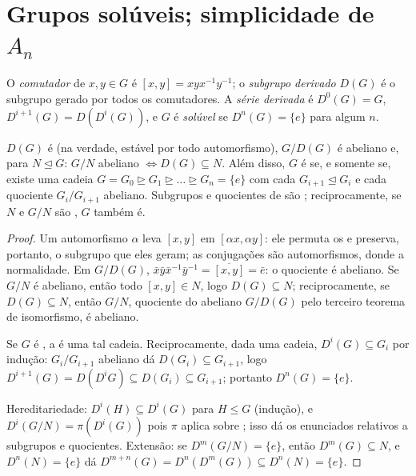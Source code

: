 \section{Grupos solúveis; simplicidade de \texorpdfstring{$A_n$}{An}}

\begin{definition}\label{def:b3:groups:derived}
O \emph{comutador} de $x, y \in G$ é $[x,y]
= xyx^{-1}y^{-1}$; o \emph{subgrupo
derivado} $D(G)$ é o subgrupo gerado por
todos os comutadores. A \emph{série derivada} é $D^0(G) = G$, $D^{i+1}(G) = D(D^i(G))$, e $G$
é \emph{solúvel} se $D^n(G) =
\{e\}$ para algum $n$.
\end{definition}

\begin{proposition}\label{prop:b3:groups:derived}
$D(G)$ é  (na verdade, estável por todo automorfismo),
$G/D(G)$ é abeliano e, para $N \trianglelefteq G$: $G/N$ abeliano $\iff
D(G) \subseteq N$. Além
disso, $G$ é  se, e somente se, existe uma cadeia $G = G_0 \trianglerighteq G_1 \trianglerighteq \dots
\trianglerighteq G_n = \{e\}$ com
cada $G_{i+1} \trianglelefteq
G_i$ e cada quociente $G_i/G_{i+1}$ abeliano. Subgrupos e quocientes de
 são ; reciprocamente, se $N$ e $G/N$ são
, $G$ também é.
\end{proposition}

\begin{proof}
Um automorfismo $\alpha$ leva $[x,y]$ em $[\alpha x, \alpha y]$: ele permuta os
 e preserva, portanto, o subgrupo que eles geram; as
conjugações são automorfismos, donde a normalidade. Em $G/D(G)$,
$\bar x\bar y \bar x^{-1}\bar y^{-1} = \overline{[x,y]} = \bar e$: o quociente é abeliano. Se $G/N$ é abeliano, então todo
$[x,y] \in
N$, logo $D(G) \subseteq N$; reciprocamente, se $D(G) \subseteq N$, então $G/N$, quociente
do abeliano $G/D(G)$ pelo terceiro teorema de isomorfismo, é
abeliano.

Se $G$ é , a  é uma tal cadeia. Reciprocamente,
dada uma cadeia, $D^i(G) \subseteq G_i$ por indução: $G_i/G_{i+1}$ abeliano dá $D(G_i) \subseteq G_{i+1}$, logo $D^{i+1}(G) = D(D^i G)
\subseteq D(G_i) \subseteq G_{i+1}$;
portanto $D^n(G) = \{e\}$.

Hereditariedade: $D^i(H) \subseteq D^i(G)$ para $H \leq G$ (indução), e $D^i(G/N) = \pi(D^i(G))$ pois $\pi$
aplica  sobre ; isso dá os enunciados relativos a
subgrupos e quocientes. Extensão: se $D^m(G/N) = \{e\}$, então $D^m(G) \subseteq N$, e $D^n(N) = \{e\}$ dá
$D^{m+n}(G) = D^n(D^m(G)) \subseteq D^n(N)
= \{e\}$.
\end{proof}

